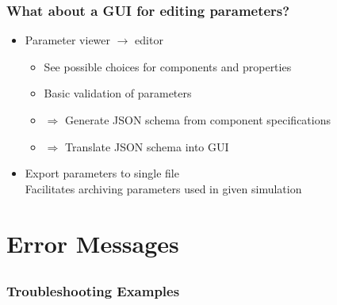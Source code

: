 \documentclass[aspectratio=169]{beamer}
\begin{document}
\begin{frame}
  \frametitle{What about a GUI for editing parameters?}

  \begin{itemize}
  \item Parameter viewer $\rightarrow$ editor
    \begin{itemize}
    \item See possible choices for components and properties
    \item Basic validation of parameters
    \item $\Rightarrow$ Generate JSON schema from component
      specifications
    \item $\Rightarrow$ Translate JSON schema into GUI
    \end{itemize}
  \item Export parameters to single file\\
    Facilitates archiving parameters used in given simulation
  \end{itemize}

\end{frame}


\section{Error Messages}
\subsection{}

\begin{frame}
  \frametitle{Troubleshooting Examples}

  
\end{frame}


\end{document}
